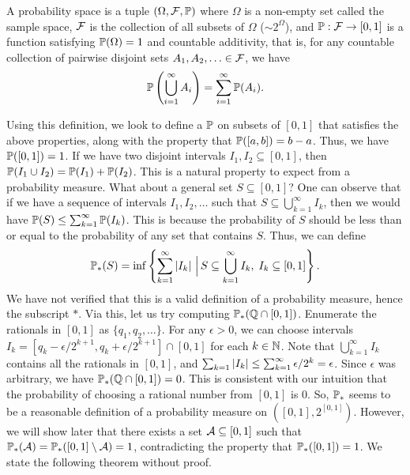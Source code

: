 \begin{definition}
    A probability space is a tuple $(\Omega,\mathcal{F},\mathbb{P})$ where $\Omega$ is a non-empty set called the sample space, $\mathcal{F}$ is the collection of all subsets of $\Omega$ ($\sim 2^{\Omega}$), and $\mathbb{P}:\mathcal{F}\to[0,1]$ is a function satisfying $\mathbb{P}(\Omega)=1$ and countable additivity, that is, for any countable collection of pairwise disjoint sets $A_{1},A_{2},\ldots \in \mathcal{F}$, we have
    \begin{align}
        \mathbb{P}\left(\bigcup_{i=1}^{\infty}A_{i}\right) = \sum_{i=1}^{\infty}\mathbb{P}(A_{i}).
    \end{align}
\end{definition}

Using this definition, we look to define a $\mathbb{P}$ on subsets of $[0,1]$ that satisfies the above properties, along with the property that $\mathbb{P}([a,b]) = b-a$. Thus, we have $\mathbb{P}([0,1]) = 1$. If we have two disjoint intervals $I_{1},I_{2} \subseteq [0,1]$, then $\mathbb{P}(I_{1}\cup I_{2}) = \mathbb{P}(I_{1}) + \mathbb{P}(I_{2})$. This is a natural property to expect from a probability measure. What about a general set $S \subseteq [0,1]$? One can observe that if we have a sequence of intervals $I_{1},I_{2},\ldots$ such that $S \subseteq \bigcup_{k=1}^{\infty}I_{k}$, then we would have $\mathbb{P}(S) \leq \sum_{k=1}^{\infty}\mathbb{P}(I_{k})$. This is because the probability of $S$ should be less than or equal to the probability of any set that contains $S$. Thus, we can define
\begin{align}
    \mathbb{P}_{\ast}(S) = \inf \left\{ \sum_{k=1}^{\infty}\left| I_{k} \right| \, \Big| \, S \subseteq \bigcup_{k=1}^{\infty}I_{k}, \; I_{k} \subseteq [0,1] \right\}.
\end{align}
We have not verified that this is a valid definition of a probability measure, hence the subscript $\ast$. Via this, let us try computing $\mathbb{P}_{\ast}(\mathbb{Q} \cap [0,1])$. Enumerate the rationals in $[0,1]$ as $\{q_{1},q_{2},\ldots\}$. For any $\epsilon > 0$, we can choose intervals $I_{k} = [q_{k}-\epsilon/2^{k+1},q_{k}+\epsilon/2^{k+1}] \cap [0,1]$ for each $k \in \mathbb{N}$. Note that $\bigcup_{k=1}^{\infty}I_{k}$ contains all the rationals in $[0,1]$, and $\sum_{k=1} \left| I_{k} \right| \leq \sum_{k=1}^{\infty}\epsilon/2^{k} = \epsilon$. Since $\epsilon$ was arbitrary, we have $\mathbb{P}_{\ast}(\mathbb{Q} \cap [0,1]) = 0$. This is consistent with our intuition that the probability of choosing a rational number from $[0,1]$ is $0$. So, $\mathbb{P}_{\ast}$ seems to be a reasonable definition of a probability measure on $([0,1],2^{[0,1]})$. However, we will show later that there exists a set $\mathcal{A} \subseteq [0,1]$ such that $\mathbb{P}_{\ast}(\mathcal{A}) = \mathbb{P}_{\ast}([0,1]\setminus \mathcal{A}) = 1$, contradicting the property that $\mathbb{P}_{\ast}([0,1]) = 1$. We state the following theorem without proof.
